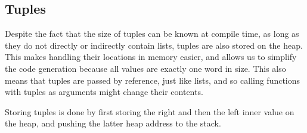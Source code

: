 \subsection{Tuples}
Despite the fact that the size of tuples can be known at compile time, as long as they do not directly or indirectly contain lists, tuples are also stored on the heap. This makes handling their locations in memory easier, and allows us to simplify the code generation because all values are exactly one word in size. This also means that tuples are passed by reference, just like lists, and so calling functions with tuples as arguments might change their contents.

Storing tuples is done by first storing the right and then the left inner value on the heap, and pushing the latter heap address to the stack.

